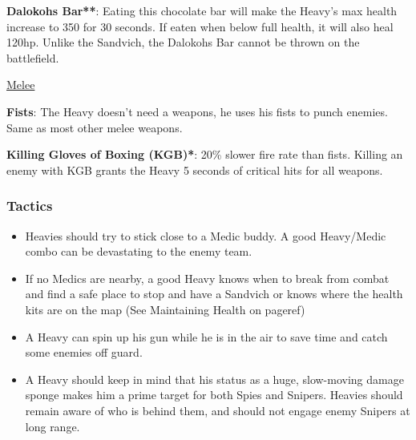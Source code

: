 {\bf Dalokohs Bar**}: Eating this chocolate bar will make the Heavy's max health increase to 350 for 30 seconds. If eaten when below full health, it will also heal 120hp. Unlike the Sandvich, the Dalokohs Bar cannot be thrown on the battlefield.

\newpage

\begin {center}
\underline {Melee}
\end {center}

{\bf Fists}: The Heavy doesn't need a weapons, he uses his fists to punch enemies. Same as most other melee weapons.

{\bf Killing Gloves of Boxing (KGB)*}:  20\% slower fire rate than fists.  Killing an enemy with KGB grants the Heavy 5 seconds of critical hits for all weapons.


\subsubsection {Tactics}
\begin {itemize}

\item Heavies should try to stick close to a Medic buddy. A good Heavy/Medic combo can be devastating to the enemy team. 

\item If no Medics are nearby, a good Heavy knows when to break from combat and find a safe place to stop and have a Sandvich or knows where the health kits are on the map (See Maintaining Health on {{pageref}})

\item A Heavy can spin up his gun while he is in the air to save time and catch some enemies off guard.

\item A Heavy should keep in mind that his status as a huge, slow-moving damage sponge makes him a prime target for both Spies and Snipers. Heavies should remain aware of who is behind them, and should not engage enemy Snipers at long range.

\end {itemize}